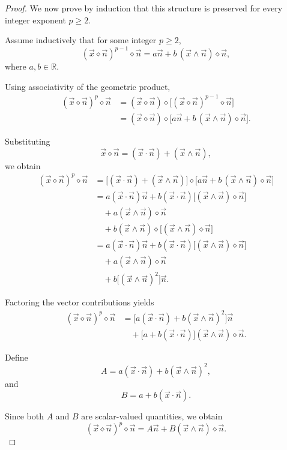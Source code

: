\documentclass{amsart}
\theoremstyle{plain}
\numberwithin{equation}{section}
\begin{document}
\begin{proof}
We now prove by induction that this structure is preserved for
every integer exponent $p\ge2$.

Assume inductively that for some integer $p\ge2$,
\[
(\vec x\diamond\vec n)^{p-1}\diamond\vec n
=
a\vec n
+
b\,(\vec x\wedge\vec n)\diamond\vec n,
\]
where $a,b\in\mathbb R$.

Using associativity of the geometric product,
\begin{align*}
(\vec x\diamond\vec n)^p\diamond\vec n
&=
(\vec x\diamond\vec n)
\diamond
\Big[
(\vec x\diamond\vec n)^{p-1}\diamond\vec n
\Big] \\[4pt]
&=
(\vec x\diamond\vec n)
\diamond
\Big[
a\vec n
+
b\,(\vec x\wedge\vec n)\diamond\vec n
\Big].
\end{align*}

Substituting
\[
\vec x\diamond\vec n
=
(\vec x\cdot\vec n)
+
(\vec x\wedge\vec n),
\]
we obtain
\begin{align*}
(\vec x\diamond\vec n)^p\diamond\vec n
&=
\Big[
(\vec x\cdot\vec n)
+
(\vec x\wedge\vec n)
\Big]
\diamond
\Big[
a\vec n
+
b\,(\vec x\wedge\vec n)\diamond\vec n
\Big] \\[6pt]
%
&=
a(\vec x\cdot\vec n)\vec n
+
b(\vec x\cdot\vec n)
\Big[
(\vec x\wedge\vec n)\diamond\vec n
\Big] \\[4pt]
&\quad
+
a(\vec x\wedge\vec n)\diamond\vec n \\[4pt]
&\quad
+
b(\vec x\wedge\vec n)
\diamond
\Big[
(\vec x\wedge\vec n)\diamond\vec n
\Big] \\[6pt]
%
&=
a(\vec x\cdot\vec n)\vec n
+
b(\vec x\cdot\vec n)
\Big[
(\vec x\wedge\vec n)\diamond\vec n
\Big] \\[4pt]
&\quad
+
a(\vec x\wedge\vec n)\diamond\vec n \\[4pt]
&\quad
+
b
\Big[
(\vec x\wedge\vec n)^2
\Big]\vec n.
\end{align*}

Factoring the vector contributions yields
\begin{align*}
(\vec x\diamond\vec n)^p\diamond\vec n
&=
\Big[
a(\vec x\cdot\vec n)
+
b(\vec x\wedge\vec n)^2
\Big]\vec n \\[4pt]
&\quad
+
\Big[
a+b(\vec x\cdot\vec n)
\Big]
(\vec x\wedge\vec n)\diamond\vec n.
\end{align*}

Define
\[
A=
a(\vec x\cdot\vec n)
+
b(\vec x\wedge\vec n)^2,
\]
and
\[
B=
a+b(\vec x\cdot\vec n).
\]

Since both $A$ and $B$ are scalar-valued quantities, we obtain
\[
(\vec x\diamond\vec n)^p\diamond\vec n
=
A\vec n
+
B(\vec x\wedge\vec n)\diamond\vec n.
\]


\end{proof}
\end{document}
